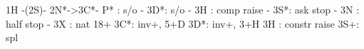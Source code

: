 1H -(2S)- 
2N*->3C*- P* : s/o
        - 3D*: s/o
        - 3H : comp raise
        - 3S*: ask stop
        - 3N : half stop
   - 3X : nat 18+
3C*: inv+, 5+D
3D*: inv+, 3+H
3H : constr raise
3S+: spl